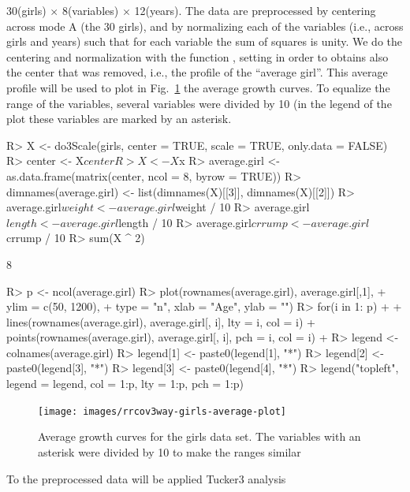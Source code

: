 \documentclass[article,shortnames, nojss]{jss}
\begin{document}
30(girls) $\times$ 8(variables)  $\times$ 12(years). The data are
preprocessed by centering across mode A (the 30 girls), and by
normalizing each of the variables (i.e., across girls and years)
such that for each variable the sum of squares is unity. We do
the centering and normalization with the function , setting
 in order to obtains also the center that was removed,
i.e., the profile of the ``average girl''. This average profile will be used
to plot in Fig.~\ref{fig-average-girl} the average growth curves.
To equalize the range of the variables,
several variables were divided by 10 (in the legend of the plot these
variables are marked by an asterisk.
\begin{Schunk}
\begin{Sinput}
R> X <- do3Scale(girls, center = TRUE, scale = TRUE, only.data = FALSE)
R> center <- X$center
R> X <- X$x
R> average.girl <- as.data.frame(matrix(center, ncol = 8, byrow = TRUE))
R> dimnames(average.girl) <- list(dimnames(X)[[3]], dimnames(X)[[2]])
R> average.girl$weight <- average.girl$weight / 10
R> average.girl$length <- average.girl$length / 10
R> average.girl$crrump <- average.girl$crrump / 10
R> sum(X ^ 2)
\end{Sinput}
\begin{Soutput}
[1] 8
\end{Soutput}
\end{Schunk}
\begin{Schunk}
\begin{Sinput}
R> p <- ncol(average.girl)
R> plot(rownames(average.girl), average.girl[,1],
+      ylim = c(50, 1200),
+      type = "n", xlab = "Age", ylab = "")
R> for(i in 1: p)
+  {
+      lines(rownames(average.girl), average.girl[, i], lty = i, col = i)
+      points(rownames(average.girl), average.girl[, i], pch = i, col = i)
+  }
R> legend <- colnames(average.girl)
R> legend[1] <- paste0(legend[1], "*")
R> legend[2] <- paste0(legend[3], "*")
R> legend[3] <- paste0(legend[4], "*")
R> legend("topleft", legend = legend, col = 1:p, lty = 1:p, pch = 1:p)
\end{Sinput}
\end{Schunk}
\begin{figure}[H]
\centering
\texttt{[image: images/rrcov3way-girls-average-plot]}\\
\caption{Average growth curves for the girls data set. The variables
with an asterisk were divided by 10 to make the ranges similar}
\label{fig-average-girl}
\end{figure}
To the preprocessed data will be applied Tucker3 analysis
\end{document}
